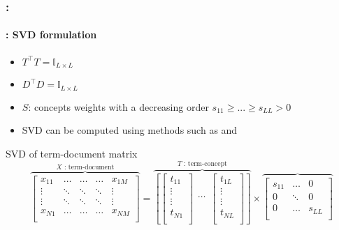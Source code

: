 \documentclass[xcolor=table]{beamer}
\begin{document}
\begin{frame}
	\frametitle{\insertshortsubtitle: \insertsection}
	\framesubtitle{\insertsubsection: SVD formulation}
	
	\begin{itemize}
		\item $T^\top T = \mathbb{I}_{L \times L}$ 
		\item $D^\top D = \mathbb{I}_{L \times L}$ 
		\item $S$: concepts weights with a decreasing order $s_{11} \ge ... \ge s_{LL} > 0$
		\item SVD can be computed using methods such as  and 
	\end{itemize}
	
	\begin{block}{SVD of term-document matrix}
		\scriptsize\bfseries
		\[
		\overbrace{
			\begin{bmatrix}
			x_{11} & \ldots & \ldots & \ldots & x_{1M} \\ 
			\vdots & \ddots & \ddots & \ddots &\vdots \\
			\vdots & \ddots & \ddots & \ddots &\vdots \\
			x_{N1} & \ldots & \ldots & \ldots & x_{NM} \\ 
			\end{bmatrix}
		}^{X \text{ : term-document}}
		=
		\overbrace{
			\left[
			\begin{bmatrix}
			t_{11} \\ 
			\vdots \\
			\vdots \\
			t_{N1} \\ 
			\end{bmatrix}
			\begin{matrix}
			\ldots \\ 
			\end{matrix}
			\begin{bmatrix}
			t_{1L} \\ 
			\vdots \\
			\vdots \\
			t_{NL} \\ 
			\end{bmatrix}
			\right]
		}^{T \text{ : term-concept}}
		\times 
		\overbrace{
			\begin{bmatrix}
			s_{11} & \ldots & 0 \\
			0 & \ddots & 0 \\
			0 & \ldots & s_{LL} \\

\end{bmatrix}}\]
\end{block}
\end{frame}
\end{document}
